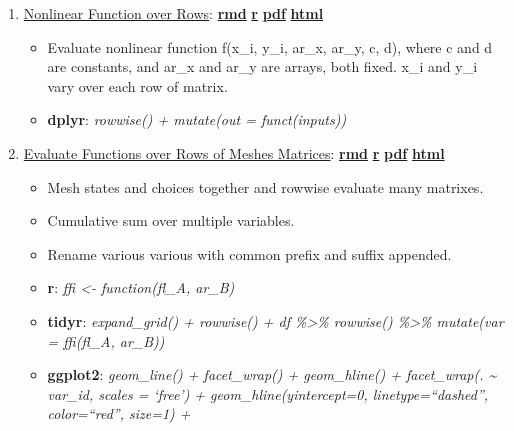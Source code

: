 \documentclass[
]{book}
\providecommand{\tightlist}{%
  \setlength{\itemsep}{0pt}\setlength{\parskip}{0pt}}
\begin{document}
\begin{enumerate}
\def\labelenumi{\arabic{enumi}.}
\tightlist
\item
  \href{https://fanwangecon.github.io/R4Econ/function/mutatef/htmlpdfr/fs_funceval.html}{Nonlinear Function over Rows}: \href{https://github.com/FanWangEcon/R4Econ/blob/master/function/mutatef//fs_funceval.Rmd}{\textbf{rmd}} \textbar{} \href{https://github.com/FanWangEcon/R4Econ/blob/master/function/mutatef/htmlpdfr/fs_funceval.R}{\textbf{r}} \textbar{} \href{https://github.com/FanWangEcon/R4Econ/blob/master/function/mutatef/htmlpdfr/fs_funceval.pdf}{\textbf{pdf}} \textbar{} \href{https://fanwangecon.github.io/R4Econ/function/mutatef/htmlpdfr/fs_funceval.html}{\textbf{html}}

  \begin{itemize}
  \tightlist
  \item
    Evaluate nonlinear function f(x\_i, y\_i, ar\_x, ar\_y, c, d), where c and d are constants, and ar\_x and ar\_y are arrays, both fixed. x\_i and y\_i vary over each row of matrix.
  \item
    \textbf{dplyr}: \emph{rowwise() + mutate(out = funct(inputs))}
  \end{itemize}
\item
  \href{https://fanwangecon.github.io/R4Econ/function/mutatef/htmlpdfr/fs_func_choice_states.html}{Evaluate Functions over Rows of Meshes Matrices}: \href{https://github.com/FanWangEcon/R4Econ/blob/master/function/mutatef//fs_func_choice_states.Rmd}{\textbf{rmd}} \textbar{} \href{https://github.com/FanWangEcon/R4Econ/blob/master/function/mutatef/htmlpdfr/fs_func_choice_states.R}{\textbf{r}} \textbar{} \href{https://github.com/FanWangEcon/R4Econ/blob/master/function/mutatef/htmlpdfr/fs_func_choice_states.pdf}{\textbf{pdf}} \textbar{} \href{https://fanwangecon.github.io/R4Econ/function/mutatef/htmlpdfr/fs_func_choice_states.html}{\textbf{html}}

  \begin{itemize}
  \tightlist
  \item
    Mesh states and choices together and rowwise evaluate many matrixes.
  \item
    Cumulative sum over multiple variables.
  \item
    Rename various various with common prefix and suffix appended.
  \item
    \textbf{r}: \emph{ffi \textless- function(fl\_A, ar\_B)}
  \item
    \textbf{tidyr}: \emph{expand\_grid() + rowwise() + df \%\textgreater\% rowwise() \%\textgreater\% mutate(var = ffi(fl\_A, ar\_B))}
  \item
    \textbf{ggplot2}: \emph{geom\_line() + facet\_wrap() + geom\_hline() + facet\_wrap(. \textasciitilde{} var\_id, scales = `free') + geom\_hline(yintercept=0, linetype=``dashed'', color=``red'', size=1) +}
  \end{itemize}
\end{enumerate}
\end{document}
